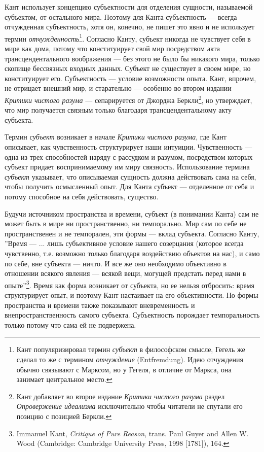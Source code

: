 \documentclass[12pt]{book}
\begin{document}
Кант использует концепцию субъектности для отделения сущности, называемой субъектом, от остального мира. Поэтому для Канта субъектность --- всегда отчужденная субъектность, хотя он, конечно, не пишет это явно и не использует термин \textit{отчужденность}\footnote{Кант популяризировал термин \textit{субъект} в философском смысле, Гегель же сделал то же с термином \textit{отчуждение} (Entfremdung). Идею отчуждения обычно связывают с Марксом, но у Гегеля, в отличие от Маркса, она занимает центральное место.}. Согласно Канту, субъект никогда не чувствует себя в мире как дома, потому что конституирует свой мир посредством акта трансцендентального воображения --- без этого не было бы никакого мира, только скопище бессвязных входных данных. Субъект не существует в своем мире, но конституирует его. Субъектность --- условие возможности опыта. Кант, впрочем, не отрицает внешний мир, и старательно --- особенно во втором издании \textit{Критики чистого разума} --- сепарируется от Джорджа Беркли\footnote{Кант добавляет во второе издание \textit{Критики чистого разума} раздел \textit{Опровержение идеализма} исключительно чтобы читатели не спутали его позицию с позицией Беркли.}, но утверждает, что мир получается связным только благодаря трансцендентальному акту субъекта.

Термин \textit{субъект} возникает в начале \textit{Критики чистого разума}, где Кант описывает, как чувственность структурирует наши интуиции. Чувственность --- одна из трех способностей наряду с рассудком и разумом, посредством которых субъект придает воспринимаемому им миру связность. Использование термина \textit{субъект} указывает, что описываемая сущность должна действовать сама на себя, чтобы получить осмысленный опыт. Для Канта субъект --- отделенное от себя и потому способное на себя действовать, существо.

Будучи источником пространства и времени, субъект (в понимании Канта) сам не может быть в мире ни пространственно, ни темпорально. Мир сам по себе не пространственен и не темпорален, эти формы --- вклад субъекта. Согласно Канту, ''Время --- ... лишь субъективное условие нашего созерцания (которое всегда чувственно, т.е. возможно только благодаря воздействию объектов на нас), и само по себе, вне субъекта --- ничто. И все же оно необходимо объективно в отношении всякого явления --- всякой вещи, могущей предстать перед нами в опыте''\footnote{Immanuel Kant, \textit{Critique of Pure Reason}, trans. Paul Guyer and Allen W. Wood (Cambridge: Cambridge University Press, 1998 [1781]), 164.}. Время как форма возникает от субъекта, но ее нельзя отбросить: время структурирует опыт, и поэтому Кант настаивает на его объективности. Но формы пространства и времени также показывают вневременность и внепространственность самого субъекта. Субъектность порождает темпоральность только потому что сама ей не подвержена.
\end{document}
